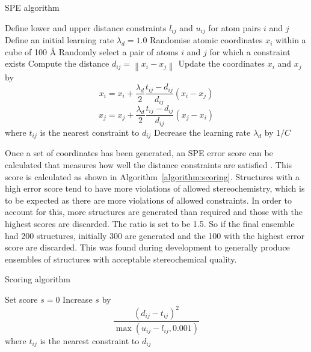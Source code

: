 \begin{algorithm}
\caption{SPE algorithm}
\label{algorithm:spe}
\begin{algorithmic}

\State Define lower and upper distance constraints $l_{ij}$ and $u_{ij}$ for atom pairs $i$ and $j$
\State Define an initial learning rate $\lambda_{d} = 1.0$
\State Randomise atomic coordinates $x_{i}$ within a cube of 100 \AA
{}
        \State Randomly select a pair of atoms $i$ and $j$ for which a constraint exists
        \State Compute the distance $d_{ij} = \left\| x_{i} - x_{j} \right\|$
            \State Update the coordinates $x_{i}$ and $x_{j}$ by
                $$
                x_{i} = x_{i} + \frac{\lambda_{d}}{2} \frac{t_{ij} - d_{ij}}{d_{ij}} (x_{i} - x_{j})
                $$
                $$
                x_{j} = x_{j} + \frac{\lambda_{d}}{2} \frac{t_{ij} - d_{ij}}{d_{ij}} (x_{j} - x_{i})
                $$
            \State where $t_{ij}$ is the nearest constraint to $d_{ij}$
        \EndIf
    \EndFor
    \State Decrease the learning rate $\lambda_{d}$ by $1 / C$
\EndFor

\end{algorithmic}
\end{algorithm}


Once a set of coordinates has been generated, an SPE error score can be calculated that measures how well the distance constraints are satisfied \cite{Agrafiotis2013}.
This score is calculated as shown in Algorithm~\ref{algorithm:scoring}.
Structures with a high error score tend to have more violations of allowed stereochemistry, which is to be expected as there are more violations of allowed constraints.
In order to account for this, more structures are generated than required and those with the highest scores are discarded.
The ratio is set to be 1.5.
So if the final ensemble had 200 structures, initially 300 are generated and the 100 with the highest error score are discarded.
This was found during development to generally produce ensembles of structures with acceptable stereochemical quality.


\begin{algorithm}
\caption{Scoring algorithm}
\label{algorithm:scoring}
\begin{algorithmic}

\State Set score $s = 0$
        \State Increase $s$ by
        $$
        \frac{(d_{ij} - t_{ij})^{2}}{\max \left ( u_{ij} - l_{ij}, 0.001 \right )}
        $$
        \State where $t_{ij}$ is the nearest constraint to $d_{ij}$
    \EndIf
\EndFor

\end{algorithmic}
\end{algorithm}


